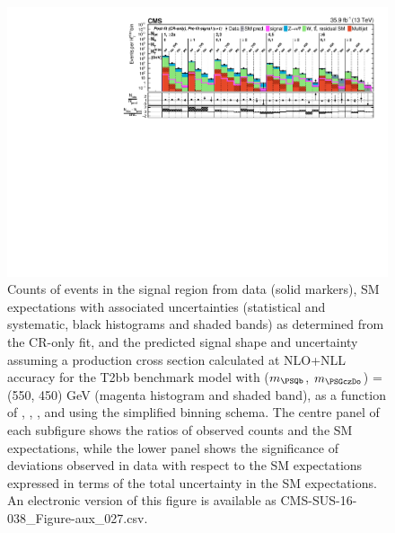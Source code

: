 \clearpage
\begin{figure}[p]
    \begin{center}
        \includegraphics[width=1.00\textwidth]{Supplementary/CMS-SUS-16-038_Figure-aux_027.pdf}
  \caption{Counts of events in the signal region from data (solid markers), SM expectations
    with associated uncertainties (statistical and systematic, black
    histograms and shaded bands) as determined from the CR-only fit,
    and the predicted signal shape and uncertainty assuming a production cross
    section calculated at NLO+NLL accuracy for the
        T2bb benchmark model with ($m_{\PSQb}$, $m_{\PSGczDo}$) = (550, 450) GeV
    (magenta histogram and shaded band),
    as a function of \njet, \nb, \scalht, and \mht using the simplified binning schema.
    The centre panel of each subfigure shows the ratios of
    observed counts and the SM expectations, while the lower panel
    shows the significance of deviations observed in data with respect
    to the SM expectations expressed in terms of the total uncertainty
    in the SM expectations.  
	An electronic version of this figure is available as CMS-SUS-16-038\_Figure-aux\_027.csv.
        }
        \label{fig:T2bb_550_450_MR_sig}
    \end{center}
\end{figure}

